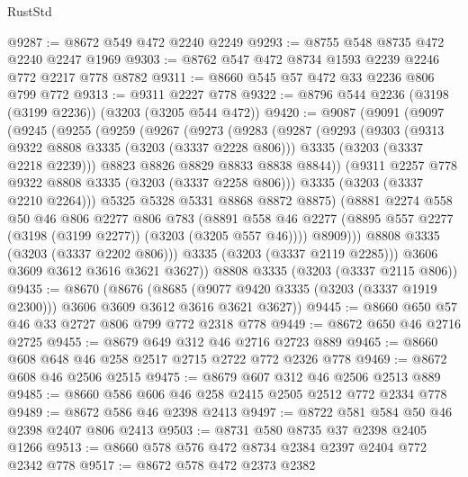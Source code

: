 \begin{lexlean}{RustStd}
\begin{coremodule}
{\begin{coremodule}
{{{{{{{{{{{{{{{@9287 := @8672 @549 @472 @2240 @2249
@9293 := @8755 @548 @8735 @472 @2240 @2247 @1969
@9303 := @8762 @547 @472 @8734 @1593 @2239 @2246 @772 @2217 @778 @8782
@9311 := @8660 @545 @57 @472 @33 @2236 @806 @799 @772
@9313 := @9311 @2227 @778
@9322 := @8796 @544 @2236 (@3198 (@3199 @2236)) (@3203 (@3205 @544 @472))
@9420 := @9087
    (@9091
      (@9097
        (@9245
          (@9255
            (@9259
              (@9267
                (@9273
                  (@9283
                    (@9287
                      (@9293
                        (@9303
                          (@9313 @9322 @8808 @3335 (@3203 (@3337 @2228 @806)))
                          @3335
                          (@3203 (@3337 @2218 @2239)))
                        @8823
                        @8826
                        @8829
                        @8833
                        @8838
                        @8844))
                    (@9311 @2257 @778 @9322 @8808 @3335 (@3203 (@3337 @2258 @806)))
                    @3335
                    (@3203 (@3337 @2210 @2264)))
                  @5325
                  @5328
                  @5331
                  @8868
                  @8872
                  @8875)
                (@8881
                  @2274
                  @558
                  @50
                  @46
                  @806
                  @2277
                  @806
                  @783
                  (@8891
                    @558
                    @46
                    @2277
                    (@8895 @557 @2277 (@3198 (@3199 @2277)) (@3203 (@3205 @557 @46))))
                  @8909)))
            @8808
            @3335
            (@3203 (@3337 @2202 @806)))
          @3335
          (@3203 (@3337 @2119 @2285)))
        @3606
        @3609
        @3612
        @3616
        @3621
        @3627))
    @8808
    @3335
    (@3203 (@3337 @2115 @806))
@9435 := @8670
    (@8676
      (@8685 (@9077 @9420 @3335 (@3203 (@3337 @1919 @2300))) @3606 @3609 @3612 @3616 @3621 @3627))
@9445 := @8660 @650 @57 @46 @33 @2727 @806 @799 @772 @2318 @778
@9449 := @8672 @650 @46 @2716 @2725
@9455 := @8679 @649 @312 @46 @2716 @2723 @889
@9465 := @8660 @608 @648 @46 @258 @2517 @2715 @2722 @772 @2326 @778
@9469 := @8672 @608 @46 @2506 @2515
@9475 := @8679 @607 @312 @46 @2506 @2513 @889
@9485 := @8660 @586 @606 @46 @258 @2415 @2505 @2512 @772 @2334 @778
@9489 := @8672 @586 @46 @2398 @2413
@9497 := @8722 @581 @584 @50 @46 @2398 @2407 @806 @2413
@9503 := @8731 @580 @8735 @37 @2398 @2405 @1266
@9513 := @8660 @578 @576 @472 @8734 @2384 @2397 @2404 @772 @2342 @778
@9517 := @8672 @578 @472 @2373 @2382
}}}}}}}}}}}}}}}
\end{coremodule}}
\end{coremodule}
\end{lexlean}
